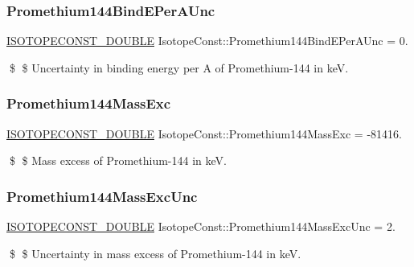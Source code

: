 \subsubsection{\texorpdfstring{Promethium144\+Bind\+E\+Per\+A\+Unc}{Promethium144BindEPerAUnc}}
{\footnotesize\ttfamily \mbox{\hyperlink{group___isotope_const-_macros_ga8f45a7272ce02c0b4c65c44636ed719a}{I\+S\+O\+T\+O\+P\+E\+C\+O\+N\+S\+T\+\_\+\+D\+O\+U\+B\+LE}} Isotope\+Const\+::\+Promethium144\+Bind\+E\+Per\+A\+Unc = 0.}

\$ \$ Uncertainty in binding energy per A of Promethium-\/144 in keV. \mbox{\label{group___isotope_const-_promethium-_pm144_ga2cebec7b4c83851b861e544c96803d2f}} 
\subsubsection{\texorpdfstring{Promethium144\+Mass\+Exc}{Promethium144MassExc}}
{\footnotesize\ttfamily \mbox{\hyperlink{group___isotope_const-_macros_ga8f45a7272ce02c0b4c65c44636ed719a}{I\+S\+O\+T\+O\+P\+E\+C\+O\+N\+S\+T\+\_\+\+D\+O\+U\+B\+LE}} Isotope\+Const\+::\+Promethium144\+Mass\+Exc = -\/81416.}

\$ \$ Mass excess of Promethium-\/144 in keV. \mbox{\label{group___isotope_const-_promethium-_pm144_ga1dbe30c7e50f0593bbcc2c9fde750716}} 
\subsubsection{\texorpdfstring{Promethium144\+Mass\+Exc\+Unc}{Promethium144MassExcUnc}}
{\footnotesize\ttfamily \mbox{\hyperlink{group___isotope_const-_macros_ga8f45a7272ce02c0b4c65c44636ed719a}{I\+S\+O\+T\+O\+P\+E\+C\+O\+N\+S\+T\+\_\+\+D\+O\+U\+B\+LE}} Isotope\+Const\+::\+Promethium144\+Mass\+Exc\+Unc = 2.}

\$ \$ Uncertainty in mass excess of Promethium-\/144 in keV. \mbox{\label{group___isotope_const-_promethium-_pm144_ga35e6ddb1902bdebc2b6229f1ab41de13}} 
